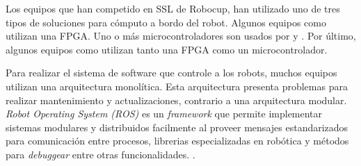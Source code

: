 \documentclass[twocolumn,10pt]{amrob}
\newcommand{\TODO}[1]{{\color{red}{ToDo: {#1}}}}
\newcommand{\EXCISE}[1]{}
\begin{document}
Los equipos que han competido en SSL de Robocup, han utilizado uno de tres tipos de soluciones para cómputo a bordo del robot. Algunos equipos como \cite{chaisoskuba} utilizan una FPGA. Uno o más microcontroladores son usados por \cite{rylltigers} y \cite{egorova2003fu}. Por último, algunos equipos como \cite{parsian-tdp-2011} utilizan tanto una FPGA como un microcontrolador. 
\par 

Para realizar el sistema de software que controle a los robots, muchos equipos utilizan una arquitectura monolítica. Esta arquitectura presenta problemas para realizar mantenimiento y actualizaciones, contrario a una arquitectura modular. \textit{Robot Operating System (ROS)} es un \textit{framework} que permite implementar sistemas modulares y distribuidos facilmente al proveer mensajes estandarizados para comunicación entre procesos, librerias especializadas en robótica y métodos para \textit{debuggear} entre otras funcionalidades.
\TODO{agregar cita de ROS}. 

\EXCISE{
  El robot presentado en este trabajo se probó inicialmente en el contexto de Robocup \emph{Small Size League} (SSL) \cite{sslWiki}. Los robots deben caber en un cilindro de 18 cm de altura por 15 cm de diámetro y deben moverse sin dañar la carpeta que forma la cancha. La pose de los robots se obtiene con un sistema de visión integrado por cámaras en la parte superior de la cancha además del software provisto por la liga para el procesamiento de imágenes. Esto requiere que los robots tengan un \textit{Patrón Estandar} de colores en su parte superior. En esta competencia, la mayoría de los equipos utiliza un control de velocidad, sin embargo, en 2011, SKUBA presentó un control basado en el torque del motor \cite{chaisoskuba}. 
}



\end{document}
